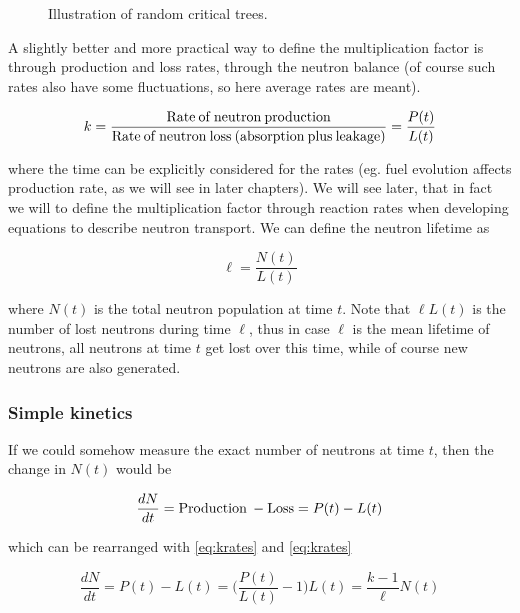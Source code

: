 \begin{figure}[ht!]
\protect {}\protect
\caption{\label{fig:randomtrees} \footnotesize{Illustration of random critical trees.}}
\end{figure}

A slightly better and more practical way to define the multiplication factor is through production and loss rates, through the neutron balance (of course such rates also have some fluctuations, so here average rates are meant).

\begin{equation}\label{eq:krates}
k = \frac{\rm {Rate \: of \: neutron \: production}}{\rm Rate \: of \: neutron \: loss \: (absorption \: plus \: leakage) } = \frac{P(t)}{L(t)}
\end{equation}


\noindent where the time can be explicitly considered for the rates (eg. fuel evolution affects production rate, as we will see in later chapters). We will see later, that in fact we will to define the multiplication factor through reaction rates when developing equations to describe neutron transport. We can define the neutron lifetime as

\begin{equation}\label{eq:ell}
\ell=\frac{N(t)}{L(t)}
\end{equation}


\noindent where $N(t)$ is the total neutron population at time $t$. Note that $\ell L(t)$ is the number of lost neutrons during time $\ell$, thus in case $\ell$ is the mean lifetime of neutrons, all neutrons at time $t$ get lost over this time, while of course new neutrons are also generated.

\subsubsection*{Simple kinetics}

If we could somehow measure the exact number of neutrons at time $t$, then the change in $N(t)$ would be

$$\frac{dN}{dt}={\rm Production \: - Loss}=P(t)-L(t)$$

which can be rearranged with \eqref{eq:krates} and \eqref{eq:krates}

\begin{equation}
\frac{dN}{dt}=P(t)-L(t)=\Big(\frac{P(t)}{L(t)}-1 \Big)L(t)=\frac{k-1}{\ell} N(t)
\end{equation}

